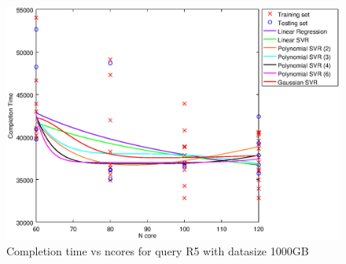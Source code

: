 
\begin {figure}[hbtp]
\centering
\includegraphics[width=\textwidth]{output/R5_1000_ONLY_1_OVER_NCORES/plot_R5_1000.eps}
\caption{Completion time vs ncores for query R5 with datasize 1000GB}
\label{fig:all_nonlinear_R5_1000}
\end {figure}
